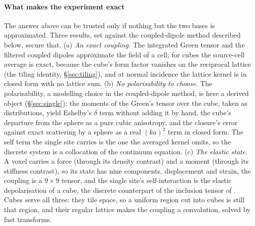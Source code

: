 \documentclass[preprint,review,12pt]{elsarticle}
\begin{document}
\paragraph{What makes the experiment exact} The answer above can be trusted only if nothing but the
two bases is approximated. Three results, set against the coupled-dipole method described below, secure
that. (a) \emph{An exact coupling.} The integrated Green tensor and the filtered coupled dipoles
approximate the field of a cell; for cubes the source-cell average is exact, because the cube's form
factor vanishes on the reciprocal lattice (the tiling identity, \S\ref{sec:tiling}), and at normal
incidence the lattice kernel is in closed form with no lattice sum. (b) \emph{No polarisability to
choose.} The polarisability, a modelling choice in the coupled-dipole method, is here a derived object
(\S\ref{sec:single}): the moments of the Green's tensor over the cube, taken as distributions, yield
Eshelby's $\delta$ term without adding it by hand, the cube's departure from the sphere as a pure cubic
anisotropy, and the closure's error against exact scattering by a sphere as a real $(ka)^2$ term in
closed form. The self term the single site carries is the one the averaged kernel omits, so the
discrete system is a collocation of the continuum equation. (c) \emph{The elastic state.} A voxel
carries a force (through its density contrast) and a moment (through its stiffness contrast), so its
state has nine components, displacement and strain, the coupling is a $9\times9$ tensor, and the single
site's self-interaction is the elastic depolarisation of a cube, the discrete counterpart of the
inclusion tensor of \citet{Eshelby1957}. Cubes serve all three: they tile space, so a uniform region
cut into cubes is still that region, and their regular lattice makes the coupling a convolution, solved
by fast transforms.
\end{document}
